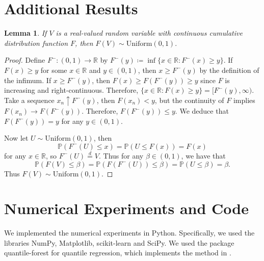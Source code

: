 \documentclass[11pt, titlepage]{article} %
\newcommand{\R}{\mathrm}
\newcommand{\Prob}[1]{\mathbb{P}\left( #1 \right)}
\numberwithin{equation}{section}
\newtheorem{lemma}{Lemma}
\theoremstyle{definition}
\numberwithin{theorem}{section}
\numberwithin{lemma}{section}
\numberwithin{corollary}{section}
\numberwithin{proposition}{section}
\numberwithin{definition}{section}
\numberwithin{remark}{section}
\begin{document}

\nocite{*}
\printbibliography


\appendix

\section{Additional Results}
\label{appendix:results}

\begin{lemma}
If \(V\) is a real-valued random variable with continuous cumulative distribution function \(F\), then \(F(V) \sim \R{Uniform}(0,1).\)
\end{lemma}
\begin{proof}
    Define \(F^{-}:(0,1) \to \mathbb{R}\) by \(F^{-}(y) \coloneqq \inf\{ x\in \mathbb{R}: F^{-}(x) \geq y\}.\) If \(F(x) \geq y\) for some \(x \in \mathbb{R}\) and \(y \in (0,1)\), then \(x \geq F^{-}(y)\) by the definition of the infimum. If \(x \geq F^{-}(y)\), then \(F(x) \geq F(F^{-}(y)) \geq y\) since \(F\) is increasing and right-continuous. Therefore, \(\{x \in \mathbb{R}: F(x) \geq y\} = [F^{-}(y), \infty).\) Take a sequence \(x_n \uparrow F^{-}(y)\), then \(F(x_n) < y\), but the continuity of \(F\) implies \(F(x_n) \to F(F^{-}(y))\). Therefore, \(F(F^{-}(y)) \leq y\). We deduce that \(F(F^{-}(y)) = y\) for any \(y \in (0,1)\). \vskip5pt

    \noindent
    Now let \(U \sim \R{Uniform}(0,1)\), then \[\Prob{F^{-}(U) \leq x} = \Prob{U \leq F(x)} = F(x)\] for any \(x \in \mathbb{R}\), so \(F^{-}(U) \overset{d}{=} V\). Thus for any \(\beta \in (0,1)\), we have that \[\Prob{F(V) \leq \beta} = \Prob{F(F^{-}(U)) \leq \beta} = \Prob{U \leq \beta} = \beta.\] Thus \(F(V) \sim \R{Uniform}(0,1).\)
\end{proof}

\section{Numerical Experiments and Code}

We implemented the numerical experiments in Python. Specifically, we used the libraries NumPy, Matplotlib, scikit-learn and SciPy. We used the package quantile-forest \cite{Johnson2024} for quantile regression, which implements the method in \cite{meinshausen2006quantile}.
\end{document}
